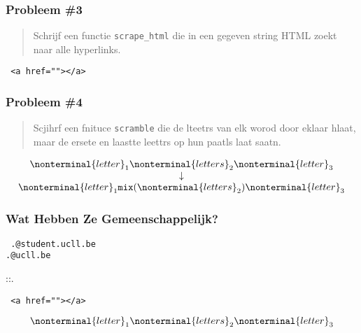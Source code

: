 \begin{frame}
  \frametitle{Probleem \#3}
  \begin{quote}
    Schrijf een functie \texttt{scrape\_html} die in een gegeven string HTML
    zoekt naar alle hyperlinks.
  \end{quote}
  \vskip2mm
  \begin{center}\tt
    <a href=""></a>
  \end{center}
\end{frame}

\begin{frame}
  \frametitle{Probleem \#4}
  \begin{quote}
    Scjihrf een fnituce	\texttt{scramble} die de
    lteetrs van elk worod door eklaar hlaat, maar de ersete
    en laastte leettrs op hun paatls laat saatn.
  \end{quote}
  \vskip2mm
  \[
    \begin{array}{c}
      \nonterminal{letter}_1\nonterminal{letters}_2\nonterminal{letter}_3 \\
      \downarrow \\
      \nonterminal{letter}_1\texttt{mix}(\nonterminal{letters}_2)\nonterminal{letter}_3
    \end{array}
  \]
\end{frame}

\begin{frame}
  \frametitle{Wat Hebben Ze Gemeenschappelijk?}
  \begin{center}\tt
    .@student.ucll.be \\
    .@ucll.be \\
  \end{center}
  \begin{center}
    ::.
  \end{center}
  \begin{center}\tt
    <a href=""></a>
  \end{center}
  \[
    \nonterminal{letter}_1\nonterminal{letters}_2\nonterminal{letter}_3
  \]
  \vskip5mm
  \begin{center}
  \end{center}
\end{frame}

